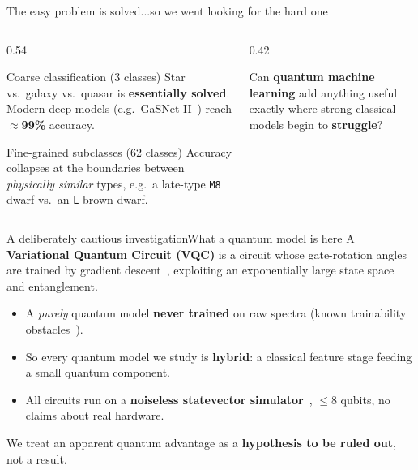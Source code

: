 \begin{frame}{The easy problem is solved}{...so we went looking for the hard one}
    \begin{columns}[T]
        \begin{column}{0.54\textwidth}
            \begin{block}{Coarse classification (3 classes)}
                Star vs.\ galaxy vs.\ quasar is \textbf{essentially solved}.
                Modern deep models (e.g.\ GaSNet-II~\cite{zhong2024gasnet}) reach
                \textbf{$\approx$99\%} accuracy.
            \end{block}
            \begin{alertblock}{Fine-grained subclasses (62 classes)}
                Accuracy collapses at the boundaries between \emph{physically
                    similar} types, e.g.\ a late-type \texttt{M8} dwarf vs.\ an
                \texttt{L} brown dwarf.
            \end{alertblock}
        \end{column}
        \begin{column}{0.42\textwidth}
            \vspace{1.2em}
            \begin{callout}
                Can \textbf{quantum machine learning} add anything useful
                exactly where strong classical models begin to \textbf{struggle}?
            \end{callout}
        \end{column}
    \end{columns}
\end{frame}

\begin{frame}{A deliberately cautious investigation}{What a quantum model is here}
    A \textbf{Variational Quantum Circuit (VQC)} is a circuit whose gate-rotation
    angles are trained by gradient descent~\cite{perezsalinas2020reuploading},
    exploiting an exponentially large state space and entanglement.

    \begin{itemize}
        \item A \emph{purely} quantum model \textbf{never trained} on raw spectra
              (known trainability obstacles~\cite{mcclean2018barren}).
        \item So every quantum model we study is \textbf{hybrid}: a classical
              feature stage feeding a small quantum component.
        \item All circuits run on a \textbf{noiseless statevector
                  simulator}~\cite{bergholm2018pennylane}, $\leq 8$ qubits, no
              claims about real hardware.
    \end{itemize}

    \begin{callout}
        We treat an apparent quantum advantage as a \textbf{hypothesis to be ruled
            out}, not a result.
    \end{callout}
\end{frame}

